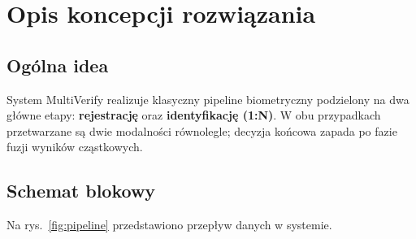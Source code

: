 \chapter{Opis koncepcji rozwiązania}
\label{cha:koncepcja}

\section{Ogólna idea}

System MultiVerify realizuje klasyczny pipeline biometryczny podzielony na dwa główne etapy: \textbf{rejestrację} oraz \textbf{identyfikację (1:N)}. W obu przypadkach przetwarzane są dwie modalności równolegle; decyzja końcowa zapada po fazie fuzji wyników cząstkowych.

\section{Schemat blokowy}

Na rys.~\ref{fig:pipeline} przedstawiono przepływ danych w systemie.

